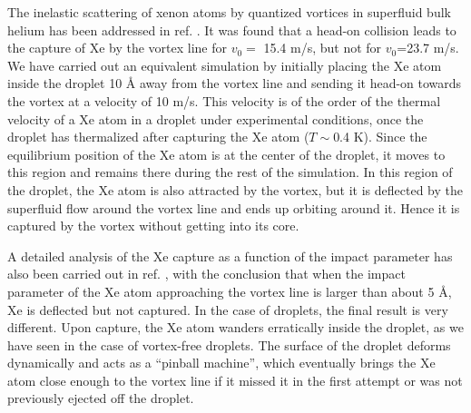  
 The inelastic scattering of xenon atoms by quantized vortices in superfluid bulk helium has been addressed in ref. \citep{Psh16}.
  It was found that
  a head-on collision leads to the capture of Xe by the vortex line for $v_0=$ 15.4 m/s, but not  for $v_0$=23.7 m/s.
We have carried out  an equivalent  simulation by initially placing
 the Xe atom  inside the droplet 10 \AA{} away
from the vortex line and   sending it  head-on towards the vortex at a velocity of 10 m/s.
This velocity  is of the order of the thermal velocity of a Xe atom in a droplet under experimental conditions,
once the droplet has thermalized after capturing the Xe atom  ($T \sim$0.4 K).\citep{Toe04} 
Since the equilibrium position of  the Xe atom is at the center of the droplet, it  moves to this region and remains there during the rest of the simulation.
In this region of the droplet, the Xe atom is also attracted by the vortex, but it is deflected by the superfluid flow around the vortex line and ends up orbiting around it.
 Hence it is captured by the vortex without getting into its  core.

A detailed  analysis of the Xe capture as a function of the impact parameter has also been  carried out in ref. \citep{Psh16}, with the conclusion that when the impact parameter 
 of the Xe atom approaching the vortex line is larger than about 5 \AA{}, Xe is deflected but not captured.\citep{Psh16}
  In the case of droplets, the final result is very different.
Upon capture, the Xe atom wanders erratically inside the droplet,  as we have seen in the case of vortex-free droplets.
 The surface of the droplet deforms dynamically and acts as
 a ``pinball machine'',  which  eventually brings the Xe atom close enough to the vortex line if it missed it
 in the first attempt or was not previously ejected off the droplet. 

